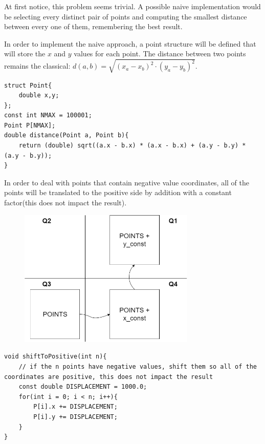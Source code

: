 \documentclass[letterpaper]{article}
\begin{document}
At first notice, this problem seems trivial. A possible naive implementation would be selecting every distinct pair of points and computing the smallest distance between every one of them, remembering the best result. 


In order to implement the naive approach, a point structure will be defined that will store the $x$ and $y$ values for each point. The distance between two points remains the classical: $d(a,b) = \sqrt{(x_a - x_b)^ 2 \cdot (y_a - y_b)^2}$.

\begin{lstlisting}
struct Point{
    double x,y;
};
const int NMAX = 100001;
Point P[NMAX];
double distance(Point a, Point b){
    return (double) sqrt((a.x - b.x) * (a.x - b.x) + (a.y - b.y) * (a.y - b.y));
}
\end{lstlisting}

In order to deal with points that contain negative value coordinates, all of the points will be translated to the positive side by addition with a constant factor(this does not impact the result).


\begin{figure} [h!]
\centering
\includegraphics[width=0.75\textwidth]{pngOfDiagrams/closestpair3.png}
\end{figure}

\begin{lstlisting}
void shiftToPositive(int n){
    // if the n points have negative values, shift them so all of the coordinates are positive, this does not impact the result
    const double DISPLACEMENT = 1000.0;
    for(int i = 0; i < n; i++){
        P[i].x += DISPLACEMENT;
        P[i].y += DISPLACEMENT;
    }
}
\end{lstlisting}
\end{document}
